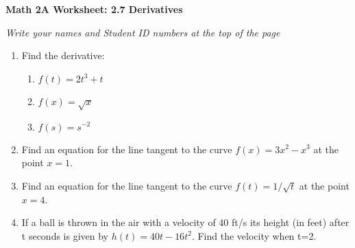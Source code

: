 \documentclass[12pt,fleqn]{article}
\begin{document}
\begin{center}
	\textbf{Math 2A Worksheet: 2.7 Derivatives}
\end{center}

\emph{Write your names and Student ID numbers at the top of the page}


\begin{enumerate}
\item Find the derivative:
\begin{enumerate}
\item $f(t)=2t^3+t$\vfill

\item $f(x)=\sqrt{x}$\vfill

\item $f(s)=s^{-2}$\vfill
\end{enumerate}

\item Find an equation for the line tangent to the curve $f(x)=3x^2-x^3$ at the point $x=1$.\vfill\vfill

\newpage
\item Find an equation for the line tangent to the curve $f(t)=1/\sqrt{t}$ at the point $x=4$.\vfill


\item If a ball is thrown in the air with a velocity of 40 ft/s its height (in feet) after t seconds is given by $h(t)=40t-16t^2$.  Find the velocity when t=2.\vfill

\end{enumerate}
\end{document}
